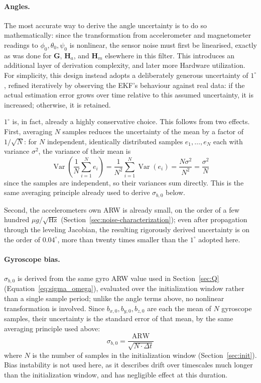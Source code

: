 \documentclass[12pt,a4paper]{article}
\begin{document}
{\paragraph{Angles.} The most accurate way to derive the angle
uncertainty is to do so mathematically: since the transformation from
accelerometer and magnetometer readings to $\phi_0, \theta_0, \psi_0$
is nonlinear, the sensor noise must first be linearised, exactly as
was done for $\bm{G}$, $\bm{H}_a$, and $\bm{H}_m$ elsewhere in this
filter. This introduces an additional layer of derivation complexity, and later more Hardware utilization.
For simplicity, this design instead adopts a deliberately generous
uncertainty of $1^{\circ}$, refined iteratively by observing the
EKF's behaviour against real data: if the actual estimation error
grows over time relative to this assumed uncertainty, it is
increased; otherwise, it is retained.

$1^{\circ}$ is, in fact, already a highly conservative choice. This
follows from two effects. First, averaging $N$ samples reduces the
uncertainty of the mean by a factor of $1/\sqrt{N}$: for $N$
independent, identically distributed samples $e_1,\ldots,e_N$ each
with variance $\sigma^2$, the variance of their mean is
\begin{equation}
  \operatorname{Var}\!\left(\frac{1}{N}\sum_{i=1}^{N} e_i\right)
  = \frac{1}{N^2}\sum_{i=1}^{N}\operatorname{Var}(e_i)
  = \frac{N\sigma^2}{N^2} = \frac{\sigma^2}{N}
\end{equation}
since the samples are independent, so their variances sum directly.
This is the same averaging principle already used to derive
$\sigma_{b,0}$ below. 

Second, the accelerometers own ARW is already
small, on the order of a few hundred $\mu g/\!\sqrt{\text{Hz}}$
(Section~\ref{sec:noise-characterization}); even after propagation
through the leveling Jacobian, the resulting rigorously derived
uncertainty is on the order of $0.04^{\circ}$, more than twenty times
smaller than the $1^{\circ}$ adopted here.

\paragraph{Gyroscope bias.} $\sigma_{b,0}$ is derived from the same gyro
ARW value used in Section~\ref{sec:Q} (Equation~\eqref{eq:sigma_omega}),
evaluated over the initialization window rather than a single sample
period; unlike the angle terms above, no nonlinear transformation is
involved. Since $b_{x,0}, b_{y,0}, b_{z,0}$ are each the mean of $N$
gyroscope samples, their uncertainty is the standard error of that
mean, by the same averaging principle used above:
\begin{equation}
  \sigma_{b,0} = \frac{\mathrm{ARW}}{\sqrt{N \cdot \Delta t}}
\end{equation}
where $N$ is the number of samples in the initialization window
(Section~\ref{sec:init}). Bias instability is not used here, as it
describes drift over timescales much longer than the initialization
window, and has negligible effect at this duration.

}
\end{document}
